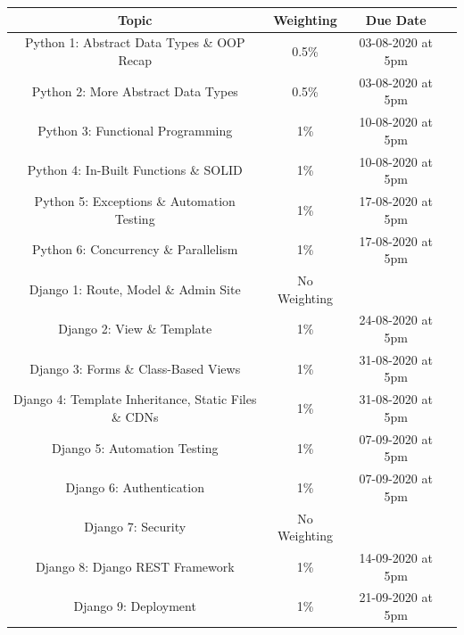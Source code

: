 \documentclass{article}
\begin{document}
\renewcommand{\arraystretch}{1.5}
\begin{tabular}{|c|c|c|c|} 
	\hline
	\textbf{Topic}                                              & \textbf{Weighting}  & \textbf{Due Date} \\ \hline 
	\small Python 1: Abstract Data Types \& OOP Recap           & \small 0.5\%        & \small 03-08-2020 at 5pm \\ \hline
	\small Python 2: More Abstract Data Types                   & \small 0.5\%        & \small 03-08-2020 at 5pm \\ \hline
	\small Python 3: Functional Programming                     & \small 1\%          & \small 10-08-2020 at 5pm \\ \hline
	\small Python 4: In-Built Functions \& SOLID                & \small 1\%          & \small 10-08-2020 at 5pm \\ \hline
	\small Python 5: Exceptions \& Automation Testing           & \small 1\%          & \small 17-08-2020 at 5pm \\ \hline
	\small Python 6: Concurrency \& Parallelism                 & \small 1\%          & \small 17-08-2020 at 5pm \\ \hline
	\small Django 1: Route, Model \& Admin Site                 & \small No Weighting &  \\ \hline
	\small Django 2: View \& Template                           & \small 1\%          & \small 24-08-2020 at 5pm \\ \hline
	\small Django 3: Forms \& Class-Based Views                 & \small 1\%          & \small 31-08-2020 at 5pm \\ \hline
	\small Django 4: Template Inheritance, Static Files \& CDNs & \small 1\%          & \small 31-08-2020 at 5pm \\ \hline
	\small Django 5: Automation Testing                         & \small 1\%          & \small 07-09-2020 at 5pm \\ \hline
	\small Django 6: Authentication                             & \small 1\%          & \small 07-09-2020 at 5pm \\ \hline
	\small Django 7: Security                                   & \small No Weighting & \\ \hline
	\small Django 8: Django REST Framework           & \small 1\%          & \small 14-09-2020 at 5pm \\ \hline
	\small Django 9: Deployment                                 & \small 1\%          & \small 21-09-2020 at 5pm \\ \hline

\end{tabular}
\end{document}
